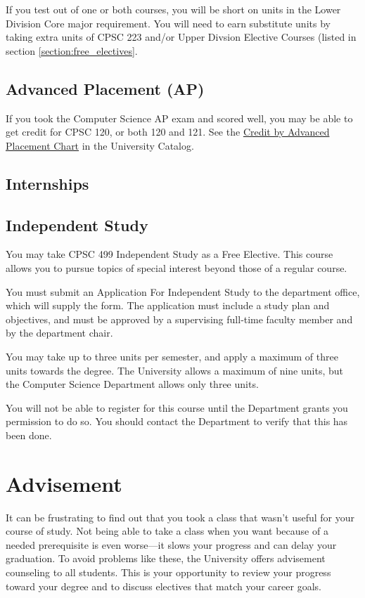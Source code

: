 \documentclass{book}
\begin{document}
If you test out of one or both courses, you will be short on units in the Lower Division Core major requirement. You will need to earn substitute units by taking extra units of CPSC 223 and/or Upper Divsion Elective Courses (listed in section \ref{section:free_electives}.

\section{Advanced Placement (AP)}
If you took the Computer Science AP exam and scored well, you may be able to get credit for CPSC 120, or both 120 and 121. See the \href{http://catalog.fullerton.edu/content.php?catoid=2&navoid=153#Credit%20by%20Advanced%20Placement%20Chart}{Credit by Advanced Placement Chart} in the University Catalog.

\section{Internships}

\section{Independent Study}

You may take CPSC 499 Independent Study as a Free Elective. This course allows you to pursue topics of special interest beyond those of a regular course.

You must submit an Application For Independent Study to the department office, which will supply the form. The application must include a study plan and objectives, and must be approved by a supervising full‑time faculty member and by the department chair.

You may take up to three units per semester, and apply a maximum of three units towards the degree. The University allows a maximum of nine units, but the Computer Science Department allows only three units.

You will not be able to register for this course until the Department grants you permission to do so. You should contact the Department to verify that this has been done.

\chapter{Advisement}

It can be frustrating to find out that you took a class that wasn’t useful for your course of study. Not being able to take a class when you want because of a needed prerequisite is even worse---it slows your progress and can delay your graduation. To avoid problems like these, the University offers advisement counseling to all students. This is your opportunity to review your progress toward your degree and to discuss electives that match your career goals.
\end{document}
